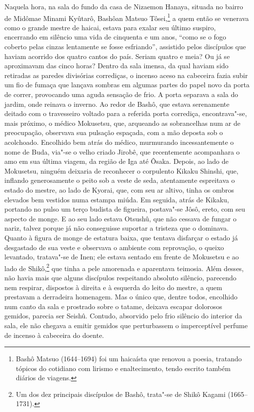 Naquela hora, na sala do fundo da casa de Nizaemon Hanaya, situada no
bairro de Midômae Minami Kyûtarô, Bashôan Matsuo Tôsei,\footnote{ Bashô Matsuo 
(1644--1694) foi um haicaísta que renovou a poesia, tratando tópicos do
cotidiano com lirismo e enaltecimento, tendo escrito também diários de
viagens.} a quem então se venerava como o grande mestre de haicai,
estava para exalar seu último suspiro, encerrando em silêncio uma vida
de cinquenta e um anos, ``como se o fogo coberto pelas
cinzas lentamente se fosse esfriando'', assistido pelos
discípulos que haviam acorrido dos quatro cantos do país. Seriam quatro
e meia? Ou já se aproximavam das cinco horas? Dentro da sala imensa, da
qual haviam sido retiradas as paredes divisórias corrediças, o incenso
aceso na cabeceira fazia subir um fio de fumaça que lançava sombras em
algumas partes do papel novo da porta de correr, provocando uma aguda
sensação de frio. A porta separava a sala do jardim, onde reinava o
inverno. Ao redor de Bashô, que estava serenamente deitado com o
travesseiro voltado para a referida porta corrediça, encontrava"-se,
mais próximo, o médico Mokusetsu, que, arqueando as sobrancelhas num ar
de preocupação, observava sua pulsação espaçada, com a mão deposta sob
o acolchoado. Encolhido bem atrás do médico, murmurando incessantemente
o nome de Buda, via"-se o velho criado Jirobê, que recentemente
acompanhara o amo em sua última viagem, da região de Iga até Ôsaka.
Depois, ao lado de Mokusetsu, ninguém deixaria de reconhecer o
corpulento Kikaku Shinshi, que, inflando generosamente o peito sob a
veste de seda, atentamente espreitava o estado do mestre, ao lado de
Kyorai, que, com seu ar altivo, tinha os ombros elevados bem vestidos
numa estampa miúda. Em seguida, atrás de Kikaku, portando no pulso um
terço budista de figueira, postava"-se Jôsô, ereto, com seu aspecto de
monge. E ao seu lado estava Otsushû, que não cessava de fungar o nariz,
talvez porque já não conseguisse suportar a tristeza que o dominava.
Quanto à figura de monge de estatura baixa, que tentava disfarçar o
estado já desgastado de sua veste e observava o ambiente com
reprovação, o queixo levantado, tratava"-se de Inen; ele estava sentado
em frente de Mokusetsu e ao lado de Shikô,\footnote{ Um dos dez
principais discípulos de Bashô, trata"-se de Shikô Kagami (1665--1731).}
que tinha a pele amorenada e aparentava teimosia. Além desses, não
havia mais que alguns discípulos respeitando absoluto silêncio,
parecendo nem respirar, dispostos à direita e à esquerda do leito do
mestre, a quem prestavam a derradeira homenagem. Mas o único que,
dentre todos, encolhido num canto da sala e prostrado sobre o tatame,
deixava escapar dolorosos gemidos, parecia ser Seishû. Contudo,
absorvido pelo frio silêncio do interior da sala, ele não chegava a
emitir gemidos que perturbassem o imperceptível perfume de incenso à
cabeceira do doente.

